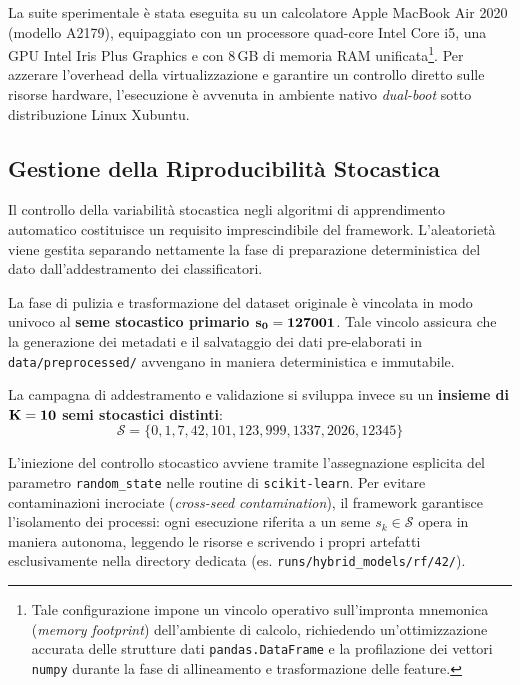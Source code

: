 La suite sperimentale è stata eseguita su un calcolatore Apple MacBook Air 2020 (modello A2179), equipaggiato con un processore quad-core Intel Core i5, una GPU Intel Iris Plus Graphics e con 8\,GB di memoria RAM unificata\footnote{Tale configurazione impone un vincolo operativo sull'impronta mnemonica (\textit{memory footprint}) dell'ambiente di calcolo, richiedendo un'ottimizzazione accurata delle strutture dati \texttt{pandas.DataFrame} e la profilazione dei vettori \texttt{numpy} durante la fase di allineamento e trasformazione delle feature.}.
Per azzerare l'overhead della virtualizzazione e garantire un controllo diretto sulle risorse hardware, l'esecuzione è avvenuta in ambiente nativo \textit{dual-boot} sotto distribuzione Linux Xubuntu.

\subsection{Gestione della Riproducibilità Stocastica}
\label{subsec:riproducibilita_seed}

Il controllo della variabilità stocastica negli algoritmi di apprendimento automatico costituisce un requisito imprescindibile del framework. 
L'aleatorietà viene gestita separando nettamente la fase di preparazione deterministica del dato dall'addestramento dei classificatori.

La fase di pulizia e trasformazione del dataset originale è vincolata in modo univoco al \textbf{seme stocastico primario $\bf{s_0 = 127001}$}. 
Tale vincolo assicura che la generazione dei metadati e il salvataggio dei dati pre-elaborati in \texttt{data/preprocessed/} avvengano in maniera deterministica e immutabile.

La campagna di addestramento e validazione si sviluppa invece su un \textbf{insieme di $\bf{K=10}$ semi stocastici distinti}:
\begin{equation}
    \label{eq:random_seeds}
    \mathcal{S} = \{0, 1, 7, 42, 101, 123, 999, 1337, 2026, 12345\}
\end{equation}

L'iniezione del controllo stocastico avviene tramite l'assegnazione esplicita del parametro \texttt{random\_state} nelle routine di \texttt{scikit-learn}. 
Per evitare contaminazioni incrociate (\textit{cross-seed contamination}), il framework garantisce l'isolamento dei processi: ogni esecuzione riferita a un seme $s_k \in \mathcal{S}$ opera in maniera autonoma, leggendo le risorse e scrivendo i propri artefatti esclusivamente nella directory dedicata (es. \texttt{runs/hybrid\_models/rf/42/}).


